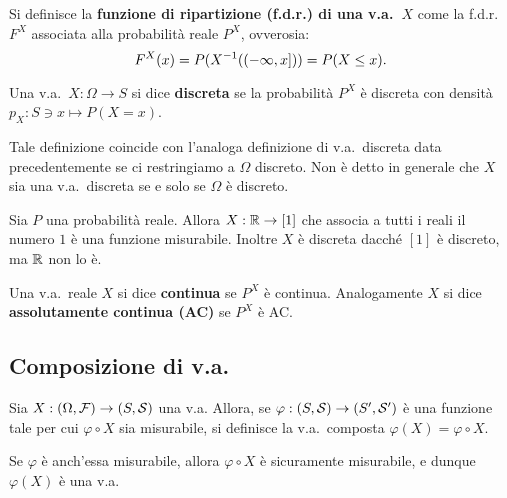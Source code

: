 \begin{multicols*}{2}
\begin{definition}
    Si definisce la \textbf{funzione di ripartizione (f.d.r.) di una
    v.a.~$X$} come la f.d.r.~$F^X$ associata alla probabilità reale
    $P^X$, ovverosia:
    \[
        F^X(x) = P(X^{-1}((-\infty, x])) = P(X \leq x).
    \]
\end{definition}

\begin{definition}[V.a.~discreta]
    Una v.a.~$X : \Omega \to S$ si dice \textbf{discreta} se
    la probabilità $P^X$ è discreta con densità
    $p_X : S \ni x \mapsto P(X = x)$. \smallskip


    Tale definizione coincide con l'analoga definizione
    di v.a.~discreta data precedentemente se ci restringiamo
    a $\Omega$ discreto. Non è detto in generale che
    $X$ sia una v.a.~discreta se e solo se $\Omega$ è discreto.
\end{definition}

\begin{example}
    Sia $P$ una probabilità reale. Allora $X : \mathbb{R} \to [1]$ che
    associa a tutti i reali il numero $1$ è una funzione misurabile.
    Inoltre $X$ è discreta dacché $[1]$ è discreto, ma $\mathbb{R}$ non
    lo è.
\end{example}

\begin{definition}[V.a.~continue e AC]
    Una v.a.~reale $X$ si dice \textbf{continua} se $P^X$ è
    continua. Analogamente $X$ si dice \textbf{assolutamente
    continua (AC)} se $P^X$ è AC.
\end{definition}

\subsection{Composizione di v.a.}

\begin{definition}
    Sia $X : (\Omega, \mathcal{F}) \to (S, \mathcal{S})$ una v.a. Allora, se
    $\varphi : (S, \mathcal{S}) \to (S', \mathcal{S}')$ è una funzione tale per cui
    $\varphi \circ X$ sia misurabile,
    si definisce la v.a.~composta $\varphi(X) = \varphi \circ X$. 
\end{definition}

\begin{remark}
    Se $\varphi$ è anch'essa misurabile, allora $\varphi \circ X$ è
    sicuramente misurabile, e dunque $\varphi(X)$ è una v.a.
\end{remark}


\end{multicols*}
